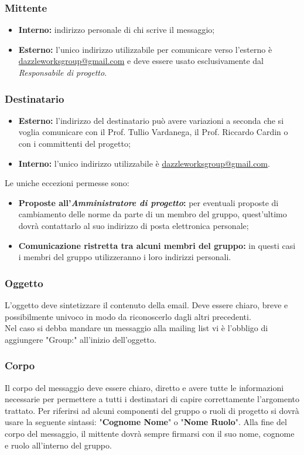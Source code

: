 		\subsubsection{Mittente}
\begin{itemize}
	\item \textbf{Interno:} indirizzo personale di chi scrive il messaggio;
	\item \textbf{Esterno:} l'unico indirizzo utilizzabile per comunicare verso l'esterno è \url{dazzleworksgroup@gmail.com} e deve essere usato esclusivamente dal \textit{Responsabile di progetto}.
\end{itemize}
	\subsubsection{Destinatario}
\begin{itemize}
	\item \textbf{Esterno:} l'indirizzo del destinatario può avere variazioni a seconda che si voglia comunicare con il Prof. Tullio Vardanega, il Prof. Riccardo Cardin o con i committenti del progetto;
	\item \textbf{Interno:} l'unico indirizzo utilizzabile è \url{dazzleworksgroup@gmail.com}.
\end{itemize}
Le uniche eccezioni permesse sono:
\begin{itemize}
	\item \textbf{Proposte all'\textit{Amministratore di progetto}:} per eventuali proposte di cambiamento delle norme da parte di un membro del gruppo, quest'ultimo dovrà contattarlo al suo indirizzo di posta elettronica personale;
	\item \textbf{Comunicazione ristretta tra alcuni membri del gruppo:} in questi casi i membri del gruppo utilizzeranno i loro indirizzi personali.
\end{itemize}

		\subsubsection{Oggetto}
L'oggetto deve sintetizzare il contenuto della email. Deve essere chiaro, breve e possibilmente univoco in modo da riconoscerlo dagli altri precedenti.\\
Nel caso si debba mandare un messaggio alla \gls{mailing list} vi è l'obbligo di aggiungere "Group:" all'inizio dell'oggetto.
		\subsubsection{Corpo}
Il corpo del messaggio deve essere chiaro, diretto e avere tutte le informazioni necessarie per permettere a tutti i destinatari di capire correttamente l'argomento trattato. Per riferirsi ad alcuni componenti del gruppo o ruoli di progetto si dovrà usare la seguente sintassi: "\textbf{Cognome Nome}" o "\textbf{Nome Ruolo}". Alla fine del corpo del messaggio, il mittente dovrà sempre firmarsi con il suo nome, cognome e ruolo all'interno del gruppo.
